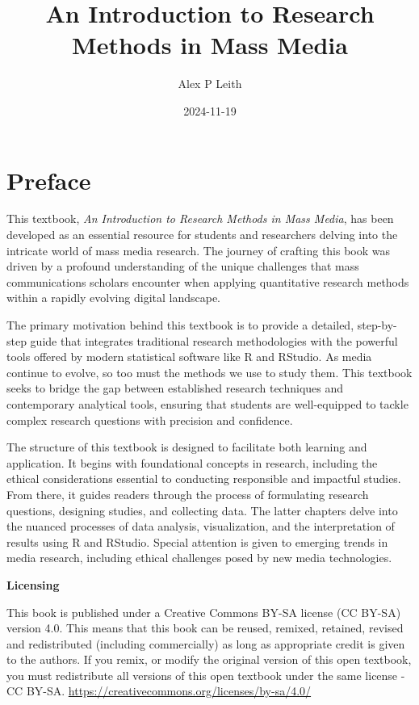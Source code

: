 \documentclass[
]{book}
\title{An Introduction to Research Methods in Mass Media}
\author{Alex P Leith}
\date{2024-11-19}
\begin{document}
\maketitle

{
\setcounter{tocdepth}{1}
\tableofcontents
}
\chapter*{Preface}\label{preface}

This textbook, \emph{An Introduction to Research Methods in Mass Media}, has been developed as an essential resource for students and researchers delving into the intricate world of mass media research. The journey of crafting this book was driven by a profound understanding of the unique challenges that mass communications scholars encounter when applying quantitative research methods within a rapidly evolving digital landscape.

The primary motivation behind this textbook is to provide a detailed, step-by-step guide that integrates traditional research methodologies with the powerful tools offered by modern statistical software like R and RStudio. As media continue to evolve, so too must the methods we use to study them. This textbook seeks to bridge the gap between established research techniques and contemporary analytical tools, ensuring that students are well-equipped to tackle complex research questions with precision and confidence.

The structure of this textbook is designed to facilitate both learning and application. It begins with foundational concepts in research, including the ethical considerations essential to conducting responsible and impactful studies. From there, it guides readers through the process of formulating research questions, designing studies, and collecting data. The latter chapters delve into the nuanced processes of data analysis, visualization, and the interpretation of results using R and RStudio. Special attention is given to emerging trends in media research, including ethical challenges posed by new media technologies.

\textbf{Licensing}

This book is published under a Creative Commons BY-SA license (CC BY-SA) version 4.0. This means that this book can be reused, remixed, retained, revised and redistributed (including commercially) as long as appropriate credit is given to the authors. If you remix, or modify the original version of this open textbook, you must redistribute all versions of this open textbook under the same license - CC BY-SA. \url{https://creativecommons.org/licenses/by-sa/4.0/}
\end{document}
